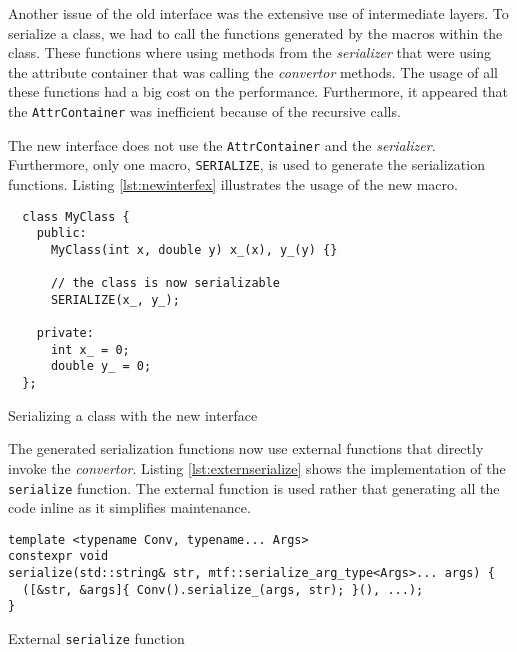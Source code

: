 Another issue of the old interface was the extensive use of intermediate layers.
To serialize a class, we had to call the functions generated by the macros
within the class. These functions where using methods from the
\textit{serializer} that were using the attribute container that was calling the
\textit{convertor} methods. The usage of all these functions had a big cost on
the performance. Furthermore, it appeared that the \texttt{AttrContainer} was
inefficient because of the recursive calls.

The new interface does not use the \texttt{AttrContainer} and the
\textit{serializer}. Furthermore, only one macro, \texttt{SERIALIZE}, is used to
generate the serialization functions. Listing \ref{lst:newinterfex} illustrates
the usage of the new macro.

\begin{listing}[ht!]
\begin{verbatim}
  class MyClass {
    public:
      MyClass(int x, double y) x_(x), y_(y) {}

      // the class is now serializable
      SERIALIZE(x_, y_);

    private:
      int x_ = 0;
      double y_ = 0;
  };
\end{verbatim}
\caption{Serializing a class with the new interface}
\label{lst:newinterfex}
\end{listing}

The generated serialization functions now use external functions that directly
invoke the \textit{convertor}. Listing \ref{lst:externserialize} shows the
implementation of the \texttt{serialize} function. The external function is used
rather that generating all the code inline as it simplifies maintenance.

\begin{listing}[ht!]
\begin{verbatim}
template <typename Conv, typename... Args>
constexpr void
serialize(std::string& str, mtf::serialize_arg_type<Args>... args) {
  ([&str, &args]{ Conv().serialize_(args, str); }(), ...);
}
\end{verbatim}
\caption{External \texttt{serialize} function}
\label{lst:externserialize}
\end{listing}

